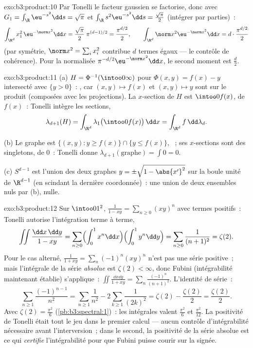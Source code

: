 \begin{solution}{exo:b3:product:10}
Par Tonelli le facteur gaussien se factorise, donc avec $G_1
= \int_\R\eu^{-s^2}\dd s = \sqrt\pi$ et $\int_\R
s^2\eu^{-s^2}\dd s = \frac{\sqrt\pi}2$ (intégrer par
parties)~:
\[
\int_{\R^d}x_1^2\,\eu^{-\norm x^2}\dd x =
\frac{\sqrt\pi}2\;\pi^{(d-1)/2} = \frac{\pi^{d/2}}2,
\qquad
\int_{\R^d}\norm x^2\eu^{-\norm x^2}\dd x =
d\cdot\frac{\pi^{d/2}}2
\]
(par symétrie, $\norm x^2 = \sum_ix_i^2$ contribue $d$
termes égaux --- le contrôle de cohérence). Pour la 
normalisée $\pi^{-d/2}\eu^{-\norm x^2}\dd x$, le second
moment est $\frac d2$.
\end{solution}

\begin{solution}{exo:b3:product:11}
(a) $H = \Phi^{-1}(\intoo0\infty)$ pour $\Phi(x, y) = f(x) -
y$ intersecté avec $\{y > 0\}$~: , car $(x, y)
\mapsto f(x)$ et $(x,y)\mapsto y$ sont  sur le
produit (composées avec les projections). La $x$-section de
$H$ est $\intoo0{f(x)}$, de  $f(x)$~: Tonelli intègre
les sections,
\[
\lambda_{d+1}(H) = \int_{\R^d}\lambda_1\bigl(\intoo0{f(x)}
\bigr)\,\dd x = \int_{\R^d}f\,\dd\lambda_d .
\]

(b) Le graphe est $\{(x,y) : y \geq f(x)\} \cap \{y \leq
f(x)\}$, ~; ses $x$-sections sont des singletons, de
 $0$~: Tonelli donne $\lambda_{d+1}(\text{graphe}) =
\int 0 = 0$.

(c) $S^{d-1}$ est l'union des deux graphes $y =
\pm\sqrt{1 - \abs{x'}^2}$ sur la boule unité de $\R^{d-1}$
(en scindant la dernière coordonnée)~: une union de deux
ensembles nuls par (b), nulle.
\end{solution}

\begin{solution}{exo:b3:product:12}
Sur $\intoo01^2$, $\frac1{1 - xy} = \sum_{n\geq0}(xy)^n$ avec
termes positifs~: Tonelli autorise l'intégration terme à
terme,
\[
\iint\frac{\dd x\,\dd y}{1 - xy}
= \sum_{n\geq0}\Bigl(\int_0^1x^n\dd x\Bigr)
\Bigl(\int_0^1y^n\dd y\Bigr)
= \sum_{n\geq0}\frac1{(n+1)^2} = \zeta(2) .
\]
Pour le cas alterné, $\frac1{1 + xy} =
\sum_n(-1)^n(xy)^n$ n'est pas une série positive~; mais
l'intégrale de la série \emph{absolue} est $\zeta(2) <
\infty$, donc Fubini (intégrabilité maintenant établie)
s'applique~: $\iint\frac{\dd x\dd y}{1 + xy} =
\sum_n\frac{(-1)^n}{(n+1)^2}$. L'identité de série~:
\[
\sum_{n\geq1}\frac{(-1)^{n-1}}{n^2}
= \sum_{n\geq1}\frac1{n^2} - 2\sum_{k\geq1}\frac1{(2k)^2}
= \zeta(2) - \frac{\zeta(2)}2 = \frac{\zeta(2)}2 .
\]
Avec $\zeta(2) = \frac{\pi^2}6$ (\cref{pb:b3:spectral:1})~:
les intégrales valent $\frac{\pi^2}6$ et $\frac{\pi^2}{12}$.
La positivité de Tonelli était tout le jeu dans le premier
calcul --- aucun contrôle d'intégrabilité nécessaire avant
l'interversion~; dans le second, la positivité de la série
absolue est ce qui \emph{certifie} l'intégrabilité pour que
Fubini puisse courir sur la signée.
\end{solution}

